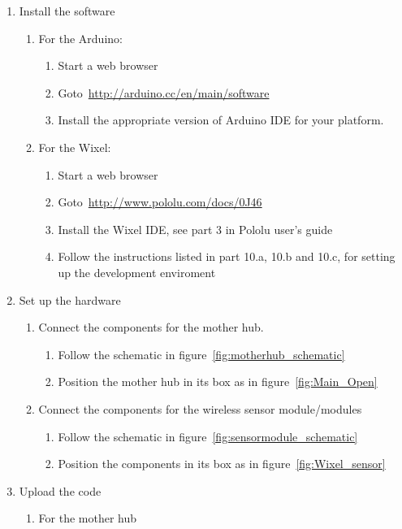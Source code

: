 \begin{enumerate}
\item Install the software
	\begin{enumerate}
	\item For the Arduino:
		\begin{enumerate}
		\item Start a web browser
		\item Goto~\url{http://arduino.cc/en/main/software}
		\item Install the appropriate version of Arduino IDE for your platform.
		\end{enumerate}
	\item For the Wixel:
		\begin{enumerate}
		\item Start a web browser
		\item Goto~\url{http://www.pololu.com/docs/0J46}
		\item Install the Wixel IDE, see part 3 in Pololu user's guide
		\item Follow the instructions listed in part 10.a, 10.b and 10.c, for setting up the development enviroment
		\end{enumerate}
	\end{enumerate}
\item Set up the hardware
	\begin{enumerate}
	\item Connect the components for the mother hub.
		\begin{enumerate}
		\item Follow the schematic in figure~\ref{fig:motherhub_schematic}
		\item Position the mother hub in its box as in figure~\ref{fig:Main_Open}
		\end{enumerate}
	\item Connect the components for the wireless sensor module/modules
		\begin{enumerate}
		\item Follow the schematic in figure~\ref{fig:sensormodule_schematic}
		\item Position the components in its box as in figure~\ref{fig:Wixel_sensor}
		\end{enumerate}
	\end{enumerate}
\item Upload the code
	\begin{enumerate}
	\item For the mother hub
		\begin{enumerate}

\end{enumerate}
\end{enumerate}
\end{enumerate}
